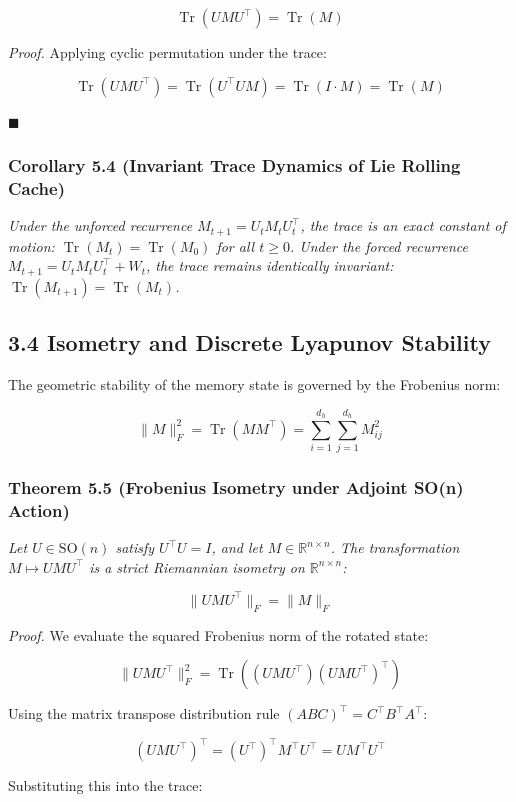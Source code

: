 \documentclass[11pt,twoside,openright]{amsbook}
\begin{document}
{{{{{{{$$\operatorname{Tr}(U M U^\top) = \operatorname{Tr}(M)$$

\textit{Proof.}  
Applying cyclic permutation under the trace:

$$\operatorname{Tr}(U M U^\top) = \operatorname{Tr}(U^\top U M) = \operatorname{Tr}(I \cdot M) = \operatorname{Tr}(M)$$

$\blacksquare$

\subsubsection{Corollary 5.4 (Invariant Trace Dynamics of Lie Rolling Cache)}
\textit{Under the unforced recurrence $M_{t+1} = U_t M_t U_t^\top$, the trace is an exact constant of motion: $\operatorname{Tr}(M_t) = \operatorname{Tr}(M_0)$ for all $t \ge 0$. Under the forced recurrence $M_{t+1} = U_t M_t U_t^\top + W_t$, the trace remains identically invariant: $\operatorname{Tr}(M_{t+1}) = \operatorname{Tr}(M_t)$.}

\subsection{3.4 Isometry and Discrete Lyapunov Stability}

The geometric stability of the memory state is governed by the Frobenius norm:

$$\|M\|_F^2 = \operatorname{Tr}(M M^\top) = \sum_{i=1}^{d_h} \sum_{j=1}^{d_h} M_{ij}^2$$

\subsubsection{Theorem 5.5 (Frobenius Isometry under Adjoint SO(n) Action)}
\textit{Let $U \in \mathrm{SO}(n)$ satisfy $U^\top U = I$, and let $M \in \mathbb{R}^{n \times n}$. The transformation $M \mapsto U M U^\top$ is a strict Riemannian isometry on $\mathbb{R}^{n \times n}$:}

$$\|U M U^\top\|_F = \|M\|_F$$

\textit{Proof.}  
We evaluate the squared Frobenius norm of the rotated state:

$$\|U M U^\top\|_F^2 = \operatorname{Tr}\left( (U M U^\top) (U M U^\top)^\top \right)$$

Using the matrix transpose distribution rule $(A B C)^\top = C^\top B^\top A^\top$:

$$(U M U^\top)^\top = (U^\top)^\top M^\top U^\top = U M^\top U^\top$$

Substituting this into the trace:

}}}}}}}
\end{document}
